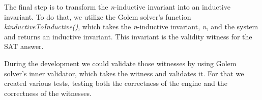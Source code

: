 The final step is to transform the \textit{n}-inductive invariant into an inductive invariant. To do that, we utilize the Golem solver's function \textit{kinductiveToInductive()}, which takes the \textit{n}-inductive invariant, \textit{n}, and the system and returns an inductive invariant. This invariant is the validity witness for the SAT answer.

\vspace{\baselineskip}\noindent During the development we could validate those witnesses by using Golem solver's inner validator, which takes the witness and validates it. For that we created various tests, testing both the correctness of the engine and the correctness of the witnesses.
